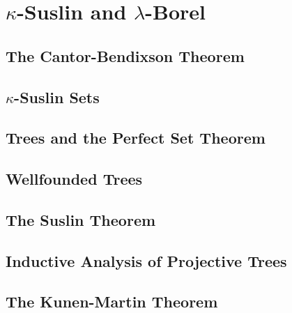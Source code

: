 \documentclass[openany]{book}
\begin{document}
\chapter{$\kappa$-Suslin and $\lambda$-Borel}

\section{The Cantor-Bendixson Theorem}

\section{$\kappa$-Suslin Sets}

\section{Trees and the Perfect Set Theorem}

\section{Wellfounded Trees}

\section{The Suslin Theorem}

\section{Inductive Analysis of Projective Trees}

\section{The Kunen-Martin Theorem}


\end{document}
